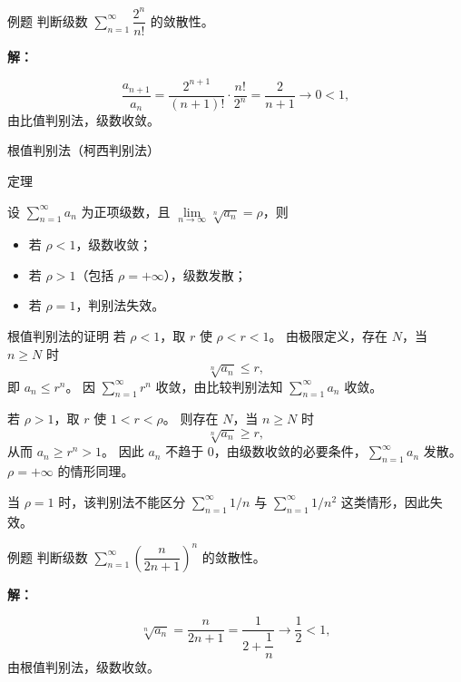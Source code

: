\documentclass[aspectratio=169,10pt]{ctexbeamer}
\begin{document}
\begin{frame}
	\begin{block}{例题}
		判断级数 \(\sum\limits_{n = 1}^{  \infty } \dfrac{2^n}{n!}\) 的敛散性。
	\end{block}
	
	\pause
	\vspace{0.8cm}
	
	\textbf{解：}
	
	\[
	\dfrac{a_{n+1}}{a_n} = \dfrac{2^{n+1}}{(n+1)!} \cdot \dfrac{n!}{2^n} = \dfrac{2}{n+1} \to 0 < 1,
	\]
	由比值判别法，级数收敛。
\end{frame}
\begin{frame}{根值判别法（柯西判别法）}
	\normalsize
	\begin{block}{定理}
		
		设 \(\sum\limits_{n = 1}^{  \infty } a_n\) 为正项级数，且 \(\lim\limits_{n\to\infty} \sqrt[n]{a_n} = \rho\)，则
		\begin{itemize}
			\item 若 \(\rho < 1\)，级数收敛；
			\item 若 \(\rho > 1\)（包括 \(\rho = +\infty\)），级数发散；
			\item 若 \(\rho = 1\)，判别法失效。
		\end{itemize}
		\end{block}
		
		
\end{frame}

\begin{frame}{根值判别法的证明}
	\normalsize
	若 $\rho<1$，取 $r$ 使 $\rho<r<1$。 由极限定义，存在 $N$，当 $n\ge N$ 时
	\[
	\sqrt[n]{a_n}\le r,
	\]
	即 $a_n\le r^n$。 因 $\sum\limits_{n = 1}^{  \infty } r^n$ 收敛，由比较判别法知 $\sum\limits_{n = 1}^{  \infty } a_n$ 收敛。
	
	若 $\rho>1$，取 $r$ 使 $1<r<\rho$。 则存在 $N$，当 $n\ge N$ 时
	\[
	\sqrt[n]{a_n}\ge r,
	\]
	从而 $a_n\ge r^n>1$。 因此 $a_n$ 不趋于 $0$，由级数收敛的必要条件，$\sum\limits_{n = 1}^{  \infty } a_n$ 发散。 $\rho=+\infty$ 的情形同理。
	
	当 $\rho=1$ 时，该判别法不能区分 $\sum\limits_{n = 1}^{  \infty } 1/n$ 与 $\sum\limits_{n = 1}^{  \infty } 1/n^2$ 这类情形，因此失效。
\end{frame}

\begin{frame}
	\begin{block}{例题}
		判断级数 \(\sum\limits_{n = 1}^{  \infty } \left(\dfrac{n}{2n+1}\right)^n\) 的敛散性。
	\end{block}
	
	\pause
	\vspace{0.8cm}
	
	\textbf{解：}
	
	\[
	\sqrt[n]{a_n} = \dfrac{n}{2n+1} = \dfrac{1}{2 + \dfrac{1}{n}} \to \dfrac{1}{2} < 1,
	\]
	由根值判别法，级数收敛。
\end{frame}
\end{document}
